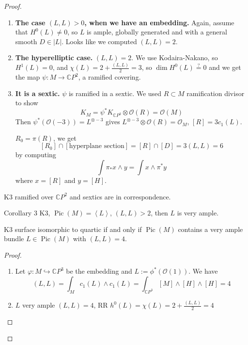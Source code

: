 \begin{proof}\leavevmode
\begin{enumerate}[label=\textbf{Step \arabic*}]
	\item \textbf{The case $(L,L)>0$, when we have an embedding.}\hspace{0.5em} Again, assume that $H^{0}(L)\neq 0$, so $L$ is ample, globally generated and with a general smooth $D\in |L|$. Looks like we computed $(L,L)=2$.

	\item  \textbf{The hyperelliptic case.}\hspace{0.5em} $(L,L)=2$. We use Kodaira-Nakano, so  $H^{1}(L)=0$, and $\chi(L)=2+\frac{(L,L)}{2}=3$, so $\dim H^{0}(L)\overset{?}{=}0$ and we get the map $\psi:M\to \mathbb{C}P^{2}$, a ramified covering.

	\item \textbf{It is a sextic.} \hspace{0.5em} $\psi$ is ramified in a sextic. We used $R\subset M$ ramification divisor to show
		\[K_M=\psi^* K_{\mathbb{C}P^{2}}\otimes \mathcal{O}(R)=\mathcal{O}(M)\]
		Then $\psi^* (\mathcal{O}(-3))=L^{\otimes-3}$ gives $L^{\otimes-3}\otimes \mathcal{O}(R)=\mathcal{O}_M$, $[R]=3c_1(L)$.
		
		$R_0=\pi(R)$, we get
		\[ [R_0] \cap [\text{hyperplane section}]=[R]\cap [D]=3(L,L)=6 \]
		by computing
		\[\int \pi_* x\wedge y=\int x\wedge \pi^*y\]
		where $x=[R]$ and  $y=[H]$.
\end{enumerate}

\begin{remark}[Check!]\leavevmode
	K3 ramified over $\mathbb{C}P^{2}$ and sextics are in correspondence.
\end{remark}

\begin{idea4}{Corollary 3}\leavevmode
	K3, $\operatorname{Pic}(M)= \left<L\right> $, $(L,L)>2$, then  $L$ is very ample.
\end{idea4}

\begin{prop}\leavevmode
	K3 surface isomorphic to quartic if and only if $\operatorname{Pic}(M)$ contains a very ample bundle $L\in\operatorname{Pic}(M)$ with $(L,L)=4$. 
\end{prop}

\begin{proof}\leavevmode
	\begin{enumerate}[label=\textbf{Step \arabic*}]
		\item Let $\varphi:M\hookrightarrow \mathbb{C}P^{3}$ be the embedding and $L:=\phi^*(\mathcal{O}(1))$. We have
			\[(L,L)=\int_{M}c_1(L)\wedge c_1(L)=\int_{\mathbb{C}P^{3}}[M]\wedge [H]\wedge [H]=4\]
			\item $L$ very ample $(L,L)=4$, RR $h^{0}(L)=\chi(L)=2+\frac{(L,L)}{2}=4$
	\end{enumerate}
\end{proof}


\end{proof}
